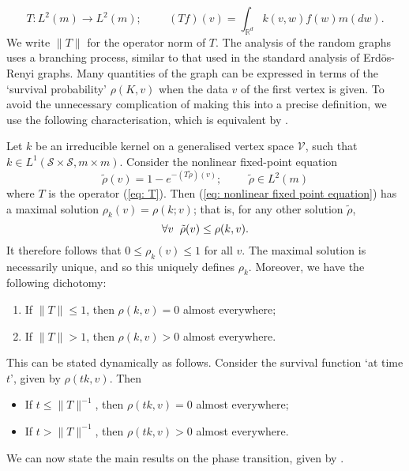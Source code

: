 \begin{equation}\label{eq: T}
       T: L^2(m)\rightarrow L^2(m); \hspace{1cm} (T f)(v)=\int_{\mathbb{R}^d} k(v,w)f(w)m(dw). 
   \end{equation}  We write $\|T\|$ for the operator norm of $T$.  The analysis of the random graphs uses a branching process, similar to that used in the standard analysis of Erd\"os-Renyi graphs. Many quantities of the graph can be expressed in terms of the `survival probability' $\rho(K, v)$ when the data $v$ of the first vertex is given. To avoid the unnecessary complication of making this into a precise definition, we use the following characterisation, which is equivalent by \cite[Theorem 6.2]{BJR07}.
   \begin{lemma}\label{lemma: survival function}
       Let $k$ be an irreducible kernel on a generalised vertex space $\mathcal{V}$, such that $k \in L^1(\mathcal{S}\times \mathcal{S}, m \times m)$. Consider the nonlinear fixed-point equation 
      \begin{equation} \label{eq: nonlinear fixed point equation} 
          \tilde{\rho}(v)=1-e^{-(T\tilde{\rho})(v)}; \hspace{1cm} \tilde{\rho}\in L^2(m)
      \end{equation} where $T$ is the operator (\ref{eq: T}). Then (\ref{eq: nonlinear fixed point equation}) has a maximal solution $\rho_k(v)=\rho(k;v)$; that is, for any other solution $\tilde{\rho}$, \begin{equation}
          \forall v \hspace{0.2cm} \tilde{\rho}(v)\leq \rho(k,v).
      \end{equation} It therefore follows that $0\leq \rho_k(v)\leq 1$ for all $v$. The maximal solution is necessarily unique, and so this uniquely defines $\rho_k.$ Moreover, we have the following dichotomy:
      \begin{enumerate}[label=\roman{*}).]
          \item If $\|T\|\leq 1$, then $\rho(k, v)=0$ almost everywhere;
          \item If $\|T\|> 1$, then $\rho(k, v)>0$ almost everywhere.
      \end{enumerate} This can be stated dynamically as follows. Consider the survival function `at time $t$', given by $\rho(tk,v)$. Then 
      \begin{itemize}
          \item If $t\leq \|T\|^{-1}$, then $\rho(tk, v)=0$ almost everywhere;
          \item If $t>\|T\|^{-1}$, then $\rho(tk, v)>0$ almost everywhere.
      \end{itemize}
      
   \end{lemma} We can now state the main results on the phase transition, given by \cite[Theorem 3.1 and Corollary 3.2]{BJR07}.
